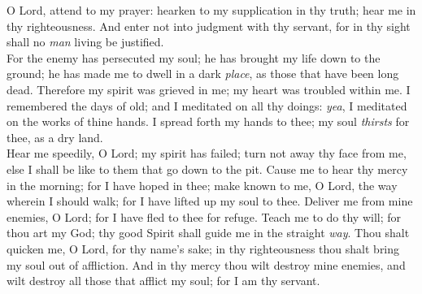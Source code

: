 
O Lord, attend to my prayer: hearken to my supplication in thy truth; hear me in thy righteousness. And enter not into judgment with thy servant, for in thy sight shall no \textit{man} living be justified.\\

\noindent
For the enemy has persecuted my soul; he has brought my life down to the ground; he has made me to dwell in a dark \textit{place}, as those that have been long dead. Therefore my spirit was grieved in me; my heart was troubled within me. I remembered the days of old; and I meditated on all thy doings: \textit{yea}, I meditated on the works of thine hands. I spread forth my hands to thee; my soul \textit{thirsts} for thee, as a dry land.\\

\noindent
Hear me speedily, O Lord; my spirit has failed; turn not away thy face from me, else I shall be like to them that go down to the pit. Cause me to hear thy mercy in the morning; for I have hoped in thee; make known to me, O Lord, the way wherein I should walk; for I have lifted up my soul to thee. Deliver me from mine enemies, O Lord; for I have fled to thee for refuge. Teach me to do thy will; for thou art my God; thy good Spirit shall guide me in the straight \textit{way}. Thou shalt quicken me, O Lord, for thy name's sake; in thy righteousness thou shalt bring my soul out of affliction. And in thy mercy thou wilt destroy mine enemies, and wilt destroy all those that afflict my soul; for I am thy servant.\\